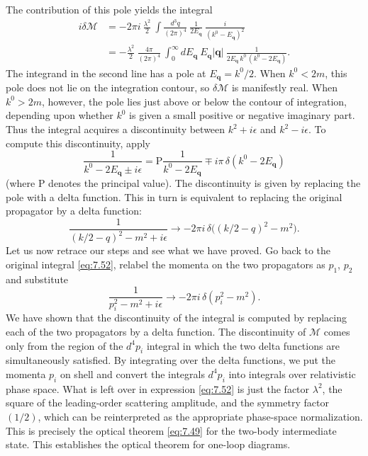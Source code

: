 The contribution of this pole yields the integral
\begin{equation}
  \begin{aligned}
    i\delta\mathcal{M} &= -2\pi i\ \frac{\lambda^2}{2}\ \int
      \frac{d^3q}{(2\pi)^4}\ \frac{1}{2E_{\mathbf{q}}}\
      \frac{i}{(k^0-E_{\mathbf{q}})^2}\\
    &= -\frac{\lambda^2}{2}\ \frac{4\pi}{(2\pi)^4}\ \int_0^{\infty}
      dE_{\mathbf{q}}\ E_{\mathbf{q}}|\mathbf{q}|\ \frac{1}{2E_{\mathbf{q}}\,k^0\,
        (k^0-2E_{\mathbf{q}})} .
  \end{aligned}
  \label{eq:7.54}
\end{equation}
The integrand in the second line has a pole at $E_{\mathbf{q}} = k^0/2$.
When $k^0 < 2m$, this pole does not lie on the integration contour, so
$\delta\mathcal{M}$ is manifestly real.  When $k^0 > 2m$, however, the pole
lies just above or below the contour of integration, depending upon whether
$k^0$ is given a small positive or negative imaginary part.  Thus the integral
acquires a discontinuity between $k^2 + i\epsilon$ and $k^2 - i\epsilon$.  To
compute this discontinuity, apply
\begin{equation}
  \frac{1}{k^0 - 2E_{\mathbf{q}} \pm i\epsilon}
  = \mathrm{P}\frac{1}{k^0 - 2E_{\mathbf{q}}}
    \mp i\pi\,\delta(k^0 - 2E_{\mathbf{q}})
\end{equation}
(where P denotes the principal value).  The discontinuity is given by
replacing the pole with a delta function.  This in turn is equivalent to
replacing the original propagator by a delta function:
\begin{equation}
  \frac{1}{(k/2-q)^2-m^2+i\epsilon}
    \to -2\pi i\,\delta\bigl( (k/2-q)^2 - m^2 \bigr) .
  \label{eq:7.55}
\end{equation}
Let us now retrace our steps and see what we have proved.  Go back to the
original integral \eqref{eq:7.52}, relabel the momenta on the two propagators
as $p_1$, $p_2$ and substitute
\begin{equation}
  \frac{1}{p_i^2 - m^2 + i\epsilon}
    \to -2\pi i\,\delta(p_i^2 - m^2) .
  \label{eq:7.56}
\end{equation}
We have shown that the discontinuity of the integral is computed by replacing
each of the two propagators by a delta function.  The discontinuity of
$\mathcal{M}$ comes only from the region of the $d^4p_i$ integral in which the
two delta functions are simultaneously satisfied.  By integrating over the
delta functions, we put the momenta $p_i$ on shell and convert the integrals
$d^4p_i$ into integrals over relativistic phase space.  What is left over in
expression \eqref{eq:7.52} is just the factor $\lambda^2$, the square of the
leading-order scattering amplitude, and the symmetry factor $(1/2)$, which
can be reinterpreted as the appropriate phase-space normalization.  This is
precisely the optical theorem \eqref{eq:7.49} for the two-body intermediate
state.  This establishes the optical theorem for one-loop diagrams.

